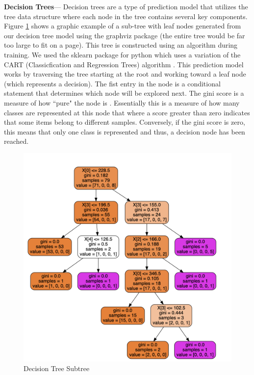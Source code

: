 \documentclass[letterpaper, 10 pt, conference]{ieeeconf}  %
\begin{document}
\textbf{Decision Trees}--- Decision trees are a type of prediction model that utilizes the tree data structure where each node in the tree contains several key components. Figure \ref{fig:DT_Subtree} shows a graphic example of a sub-tree with leaf nodes generated from our decision tree model using the graphviz package (the entire tree would be far too large to fit on a page). This tree is constructed using an algorithm during training. We used the sklearn package for python which uses a variation of the CART (Classicfication and Regression Trees) algorithm \cite{scikit-learn}. This prediction model works by traversing the tree starting at the root and working toward a leaf node (which represents a decision). The fist entry in the node is a conditional statement that determines which node will be explored next. The gini score is a measure of how ``pure" the node is \cite{ceballos_2020}. Essentially this is a measure of how many classes are represented at this node that where a score greater than zero indicates that some items belong to different samples. Conversely, if the gini score is zero, this means that only one class is represented and thus, a decision node has been reached. 

\begin{figure}[hbt]
    \centering
    \includegraphics[scale=0.25]{DT_Tree_Graph.png}
    \caption{Decision Tree Subtree}
    \label{fig:DT_Subtree}
\end{figure}
\end{document}
